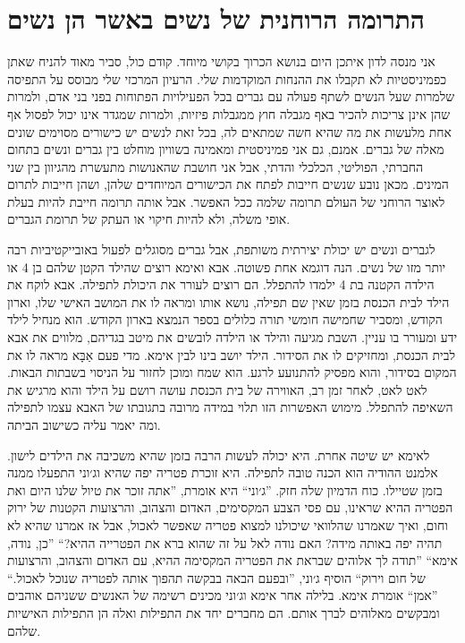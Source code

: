 \documentclass[14pt, article, extrafontsizes, twopage, a4paper]{memoir}
\begin{document}
\chapter{התרומה הרוחנית של נשים באשר הן נשים}
{\larger
אני מנסה לדון איתכן היום בנושא הכרוך בקושי מיוחד. קודם כול,
סביר מאוד להניח שאתן כפמיניסטיות לא תקבלו
את ההנחות המוקדמות שלי. הרעיון המרכזי שלי מבוסס על התפיסה
שלמרות שעל הנשים לשתף פעולה עם גברים בכל
הפעילויות הפתוחות בפני בני אדם, ולמרות שהן אינן צריכות
להכיר באף מגבלה חוץ ממגבלות פיזיות, ולמרות שמגדר
אינו יכול לפסול אף אחת מלעשות את מה שהיא חשה שמתאים לה, בכל זאת לנשים יש כישורים מסוימים
שונים מאלה של גברים. אמנם,
גם אני פמיניסטית ומאמינה בשוויון מוחלט בין
גברים ונשים בתחום החברתי, הפוליטי, הכלכלי והדתי,
אבל אני חושבת שהאנושות מתעשרת
מהגיוון בין שני המינים. מכאן נובע שנשים חייבות
לפתח את הכישורים המיוחדים שלהן, ושהן חייבות לתרום
לאוצר הרוחני של העולם תרומה שלמה
ככל האפשר. אבל אותה תרומה חייבת להיות בעלת אופי משלה,
ולא להיות חיקוי או העתק של תרומת הגברים.

לגברים ונשים יש יכולת יצירתית משותפת, אבל
גברים מסוגלים לפעול באובייקטיביות רבה יותר מזו של נשים. הנה
דוגמא אחת פשוטה. אבא ואימא רוצים שהילד הקטן שלהם
בן 4 או הילדה הקטנה בת 4 ילמדו להתפלל. הם רוצים
לעורר את היכולת לתפילה. אבא לוקח את הילד
לבית הכנסת בזמן שאין שם תפילה, נושא
אותו ומראה לו את המושב האישי שלו,
וארון הקודש, ומסביר שחמישה חומשי תורה
כלולים בספר הנמצא בארון הקודש.
הוא מנחיל לילד ידע ומעורר בו עניין. השבת
מגיעה והילד או הילדה לובשים את מיטב בגדיהם,
מלווים את אבא לבית הכנסת, ומחזיקים לו את הסידור.
הילד יושב בינו לבין אימא.
מדי פעם אַבָּא מראה לו את המקום בסידור, והוא מפסיק
להתנועע לרגע. הוא שמח ומוכן לחזור
על הניסוי בשבתות הבאות. לאט לאט, לאחר
זמן רב, האווירה של בית הכנסת עושה רושם
על הילד והוא מרגיש את השאיפה להתפלל.
מימוש האפשרות הזו תלוי במידה מרובה
בתגובתו של האבא עצמו לתפילה
ומה יאמר עליה כשישוב הביתה.

לאימא יש שיטה אחרת. היא יכולה לעשות הרבה בזמן שהיא משכיבה את הילדים לישון. אלמנט ההודיה הוא
הכנה טובה לתפילה. היא זוכרת פטריה יפה
שהיא וג׳וני התפעלו ממנה בזמן שטיילו.
כוח הדמיון שלה חזק. ''ג׳וני`` היא
אומרת, ''אתה זוכר את טיול שלנו היום ואת הפטריה ההיא
שראינו, עם פסי הצבע המקסימים, האדום והצהוב,
והרצועות הקטנות של ירוק וחום, ואיך שאמרנו
שהלוואי שיכולנו למצוא פטריה שאפשר לאכול, אבל אז אמרנו
שהיא לא תהיה יפה באותה מידה? האם נודה לאל
על זה שהוא ברא את הפטרייה ההיא?“ ''כן, נודה, אימא`` ''תודה לך
אלוהים שבראת את הפטריה המקסימה ההיא, עם האדום והצהוב,
והרצועות של חום וירוק`` הוסיף ג׳וני, ''ובפעם
הבאה בבקשה תהפוך אותה לפטריה שנוכל לאכול.`` ''אמן``
אומרת אימא. בלילה אחר אימא וג׳וני
מכינים רשימה של האנשים ששניהם אוהבים ומבקשים מאלוהים
לברך אותם. הם מחברים יחד את התפילות ואלה הן
התפילות האישיות שלהם.

}
\end{document}
